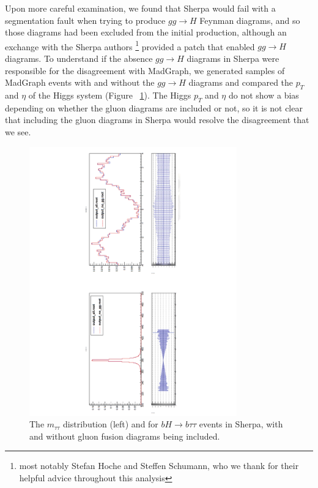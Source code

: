 Upon more careful examination, we found that Sherpa would fail with a segmentation fault
when trying to produce 
$gg\rightarrow H$ Feynman diagrams, and so those diagrams had been excluded from
the initial production, although
an exchange with the Sherpa authors \footnote{most notably Stefan Hoche and Steffen 
Schumann, who we thank for their helpful advice throughout this analysis} provided 
a patch that enabled $gg\rightarrow H$ diagrams.  To understand
if the absence $gg\rightarrow H$ diagrams in Sherpa were responsible for the disagreement
with MadGraph, we generated samples of MadGraph events with and without the $gg\rightarrow H$
diagrams and compared the $p_T$ and $\eta$ of the Higgs system (Figure ~\ref{fig:ggH}).
The Higgs $p_T$ and $\eta$ do not show a bias depending on whether the gluon diagrams
are included or not, so it is not clear that including the gluon diagrams in Sherpa would
resolve the disagreement that we see. 

\begin{figure}
  \center
  \includegraphics[width=0.8\textwidth, angle=270]{MonteCarlo/figures/ggH.pdf}
  \caption{The $m_{\tau\tau}$ distribution (left) and for $bH\rightarrow b\tau\tau$ events in Sherpa,
  with and without gluon fusion diagrams being included.
  \label{fig:ggH}}
\end{figure}




